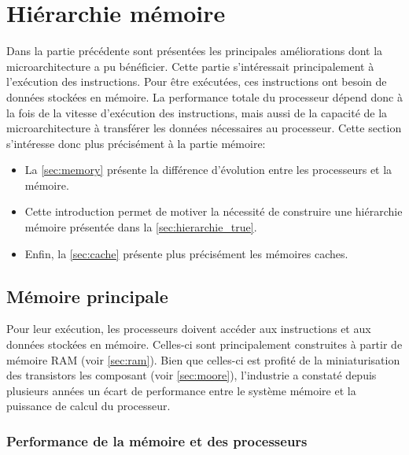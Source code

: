 \section{Hiérarchie mémoire} \label{sec:hierarchie}

Dans la partie précédente sont présentées les principales améliorations dont la microarchitecture a pu  bénéficier. Cette partie s'intéressait principalement à l'exécution des instructions. Pour être exécutées, ces instructions ont besoin de données stockées en mémoire. La performance totale du processeur dépend donc à la fois de la vitesse d'exécution des instructions, mais aussi de la capacité de la microarchitecture à transférer les données nécessaires au processeur. Cette section s'intéresse donc plus précisément à la partie mémoire:
\begin{itemize}
    \item  La \autoref{sec:memory} présente la différence d'évolution entre les processeurs et la mémoire. 
    \item Cette introduction permet de motiver la nécessité de construire une hiérarchie mémoire présentée dans la \autoref{sec:hierarchie_true}. 
    \item Enfin, la \autoref{sec:cache} présente plus précisément les mémoires caches.
\end{itemize}

\subsection{Mémoire principale} \label{sec:memory}

Pour leur exécution, les processeurs doivent accéder aux instructions et aux données stockées en mémoire. Celles-ci sont principalement construites à partir de mémoire RAM (voir \autoref{sec:ram}). Bien que celles-ci est profité de la miniaturisation des transistors les composant (voir \autoref{sec:moore}), l'industrie a constaté depuis plusieurs années un écart de performance entre le système mémoire et la puissance de calcul du processeur.


    \subsubsection{Performance de la mémoire et des processeurs}
    
